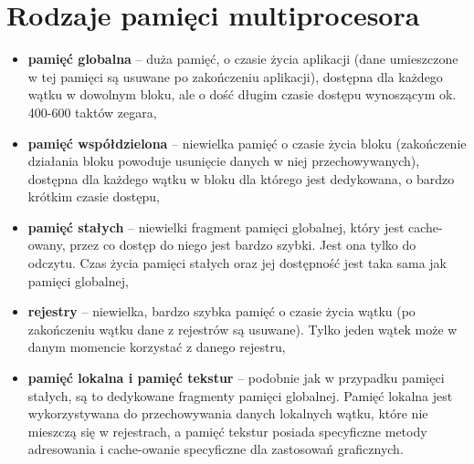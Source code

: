 \documentclass[a4paper,twoside]{article}
\begin{document}
		\section*{Rodzaje pamięci multiprocesora}
		\begin{itemize}
			\item \textbf{pamięć globalna} – duża pamięć, o czasie życia aplikacji (dane umieszczone w tej pamięci są usuwane po zakończeniu aplikacji), dostępna dla każdego wątku w dowolnym bloku, ale o dość długim czasie dostępu wynoszącym ok. 400-600 taktów zegara,
			\item \textbf{pamięć współdzielona} – niewielka pamięć o czasie życia bloku (zakończenie działania bloku powoduje usunięcie danych w niej przechowywanych), dostępna dla każdego wątku w bloku dla którego jest dedykowana, o bardzo krótkim czasie dostępu,
			\item \textbf{pamięć stałych} – niewielki fragment pamięci globalnej, który jest cache-owany, przez co dostęp do niego jest bardzo szybki. Jest ona tylko do odczytu. Czas życia pamięci stałych oraz jej dostępność jest taka sama jak pamięci globalnej,
			\item \textbf{rejestry} – niewielka, bardzo szybka pamięć o czasie życia wątku (po zakończeniu wątku dane z rejestrów są usuwane). Tylko jeden wątek może w danym momencie korzystać z danego rejestru,
			\item \textbf{pamięć lokalna i pamięć tekstur} – podobnie jak w przypadku pamięci stałych, są to dedykowane fragmenty pamięci globalnej. Pamięć lokalna jest wykorzystywana do przechowywania danych lokalnych wątku, które nie mieszczą się w rejestrach, a pamięć tekstur posiada specyficzne metody adresowania i cache-owanie specyficzne dla zastosowań graficznych.
		\end{itemize}
	
\end{document}
